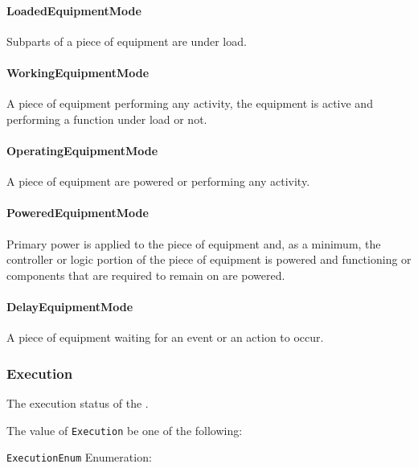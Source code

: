 \paragraph{LoadedEquipmentMode}\mbox{}
\label{sec:LoadedEquipmentMode}


Subparts of a piece of equipment are under load.


\paragraph{WorkingEquipmentMode}\mbox{}
\label{sec:WorkingEquipmentMode}


A piece of equipment performing any activity, the equipment is active and performing a function under load or not.


\paragraph{OperatingEquipmentMode}\mbox{}
\label{sec:OperatingEquipmentMode}


A piece of equipment are powered or performing any activity.


\paragraph{PoweredEquipmentMode}\mbox{}
\label{sec:PoweredEquipmentMode}


Primary  power is  applied  to the  piece  of  equipment and,  as  a minimum, the controller or logic portion of the piece of equipment is powered and functioning or components that are required to remain on are powered.


\paragraph{DelayEquipmentMode}\mbox{}
\label{sec:DelayEquipmentMode}


A piece of equipment waiting for an event or an action to occur.


\subsubsection{Execution}
\label{sec:Execution}



The execution status of the .


The value of \texttt{Execution} \MUST be one of the following: 


\texttt{ExecutionEnum} Enumeration:

